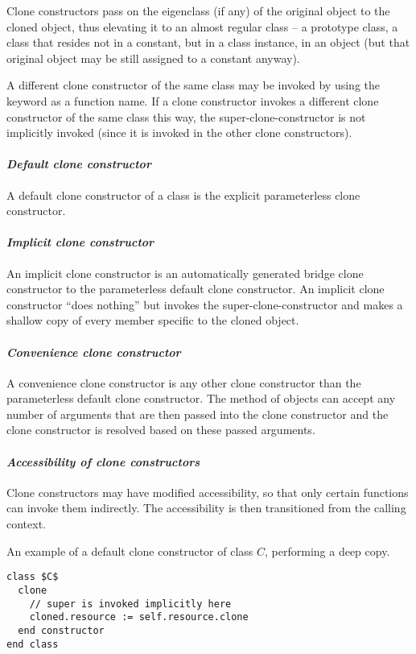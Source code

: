 Clone constructors pass on the eigenclass (if any) of the original object to the cloned object, thus elevating it to an almost regular class -- a prototype class, a class that resides not in a constant, but in a class instance, in an object (but that original object may be still assigned to a constant anyway). 

A different clone constructor of the same class may be invoked by using the  keyword as a function name. If a clone constructor invokes a different clone constructor of the same class this way, the super-clone-constructor is not implicitly invoked (since it is invoked in the other clone constructors). 

\paragraph{\em Default clone constructor}
A default clone constructor of a class is the explicit parameterless clone constructor. 

\paragraph{\em Implicit clone constructor}
An implicit clone constructor is an automatically generated bridge clone constructor to the parameterless default clone constructor. An implicit clone constructor ``does nothing'' but invokes the super-clone-constructor and makes a shallow copy of every member specific to the cloned object. 

\paragraph{\em Convenience clone constructor}
A convenience clone constructor is any other clone constructor than the parameterless default clone constructor. The  method of objects can accept any number of arguments that are then passed into the clone constructor and the clone constructor is resolved based on these passed arguments. 

\paragraph{\em Accessibility of clone constructors}
Clone constructors may have modified accessibility, so that only certain functions can invoke them indirectly. The accessibility is then transitioned from the calling context. 

\example An example of a default clone constructor of class $C$, performing a deep copy. 
\begin{lstlisting}
class $C$
  clone
    // super is invoked implicitly here
    cloned.resource := self.resource.clone
  end constructor
end class
\end{lstlisting}

